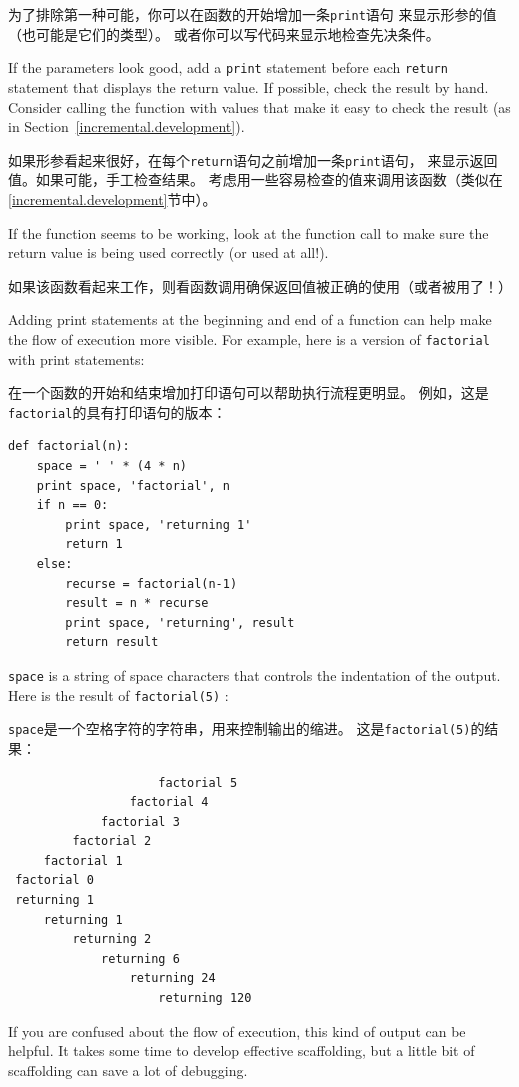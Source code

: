 \documentclass[10pt]{book}
\begin{document}
\begin{CJK}{UTF8}{gbsn}
为了排除第一种可能，你可以在函数的开始增加一条{\tt print}语句
来显示形参的值（也可能是它们的类型）。
或者你可以写代码来显示地检查先决条件。

If the parameters look good, add a {\tt print} statement before each
{\tt return} statement that displays the return value.  If
possible, check the result by hand.  Consider calling the
function with values that make it easy to check the result
(as in Section~\ref{incremental.development}).

如果形参看起来很好，在每个{\tt return}语句之前增加一条{\tt print}语句，
来显示返回值。如果可能，手工检查结果。
考虑用一些容易检查的值来调用该函数（类似在\ref{incremental.development}节中）。

If the function seems to be working, look at the function call
to make sure the return value is being used correctly (or used
at all!).

如果该函数看起来工作，则看函数调用确保返回值被正确的使用（或者被用了！）

Adding print statements at the beginning and end of a function
can help make the flow of execution more visible.
For example, here is a version of {\tt factorial} with
print statements:

在一个函数的开始和结束增加打印语句可以帮助执行流程更明显。
例如，这是{\tt factorial}的具有打印语句的版本：

\begin{verbatim}
def factorial(n):
    space = ' ' * (4 * n)
    print space, 'factorial', n
    if n == 0:
        print space, 'returning 1'
        return 1
    else:
        recurse = factorial(n-1)
        result = n * recurse
        print space, 'returning', result
        return result
\end{verbatim}
%
{\tt space} is a string of space characters that controls the
indentation of the output.  Here is the result of {\tt factorial(5)} :

{\tt space}是一个空格字符的字符串，用来控制输出的缩进。
这是{\tt factorial(5)}的结果：

\begin{verbatim}
                     factorial 5
                 factorial 4
             factorial 3
         factorial 2
     factorial 1
 factorial 0
 returning 1
     returning 1
         returning 2
             returning 6
                 returning 24
                     returning 120
\end{verbatim}
%
If you are confused about the flow of execution, this kind of
output can be helpful.  It takes some time to develop effective
scaffolding, but a little bit of scaffolding can save a lot of debugging.


\end{CJK}
\end{document}
